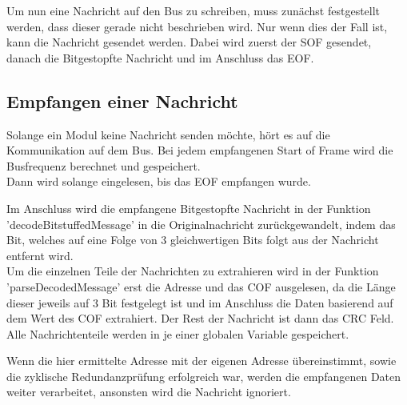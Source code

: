 

Um nun eine Nachricht auf den Bus zu schreiben, muss zunächst festgestellt werden, dass dieser gerade nicht beschrieben wird. Nur wenn dies der Fall ist, kann die Nachricht gesendet werden. Dabei wird zuerst der SOF gesendet, danach die Bitgestopfte Nachricht und im Anschluss das EOF.


\subsection{Empfangen einer Nachricht}
Solange ein Modul keine Nachricht senden möchte, hört es auf die Kommunikation auf dem Bus. Bei jedem empfangenen Start of Frame wird die Busfrequenz berechnet und gespeichert. \\
Dann wird solange eingelesen, bis das EOF empfangen wurde. 



Im Anschluss wird die empfangene Bitgestopfte Nachricht in der Funktion 'decodeBitstuffedMessage' in die Originalnachricht zurückgewandelt, indem das Bit, welches auf eine Folge von 3 gleichwertigen Bits folgt aus der Nachricht entfernt wird.\\



Um die einzelnen Teile der Nachrichten zu extrahieren wird in der Funktion 'parseDecodedMessage' erst die Adresse und das COF ausgelesen, da die Länge dieser jeweils auf 3 Bit festgelegt ist und im Anschluss die Daten basierend auf dem Wert des COF extrahiert. Der Rest der Nachricht ist dann das CRC Feld. Alle Nachrichtenteile werden in je einer globalen Variable gespeichert. 



Wenn die hier ermittelte Adresse mit der eigenen Adresse übereinstimmt, sowie die zyklische Redundanzprüfung erfolgreich war, werden die empfangenen Daten weiter verarbeitet, ansonsten wird die Nachricht ignoriert.  

